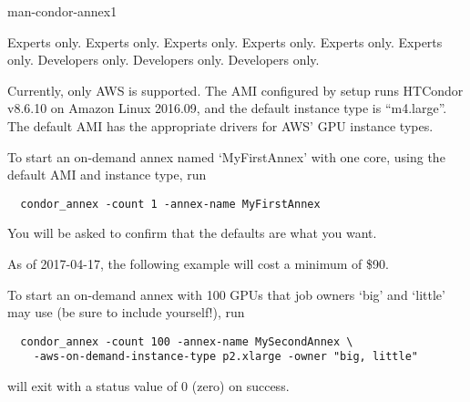 \begin{ManPage}{}{man-condor-annex}{1}
\begin{Options}
	 {Experts only.}
	 {Experts only.}
	 {Experts only.}
	 {Experts only.}
	 {Experts only.}
	 {Experts only.}
	 {Developers only.}
	 {Developers only.}
	 {Developers only.}
\end{Options}

\GenRem

Currently, only AWS is supported.  The AMI configured by setup runs
HTCondor v8.6.10 on Amazon Linux 2016.09, and the default instance type
is ``m4.large''.  The default AMI has the appropriate drivers for AWS'
GPU instance types.

\Examples

To start an on-demand annex named `MyFirstAnnex' with one core,
using the default AMI and instance type, run

\begin{verbatim}
  condor_annex -count 1 -annex-name MyFirstAnnex
\end{verbatim}

You will be asked to confirm that the defaults are what you want.

As of 2017-04-17, the following example will cost a minimum of \$90.

To start an on-demand annex with 100 GPUs that job owners `big' and `little'
may use (be sure to include yourself!), run

\begin{verbatim}
  condor_annex -count 100 -annex-name MySecondAnnex \
    -aws-on-demand-instance-type p2.xlarge -owner "big, little"
\end{verbatim}

\ExitStatus

 will exit with a status value of 0 (zero) on success.

\end{ManPage}
